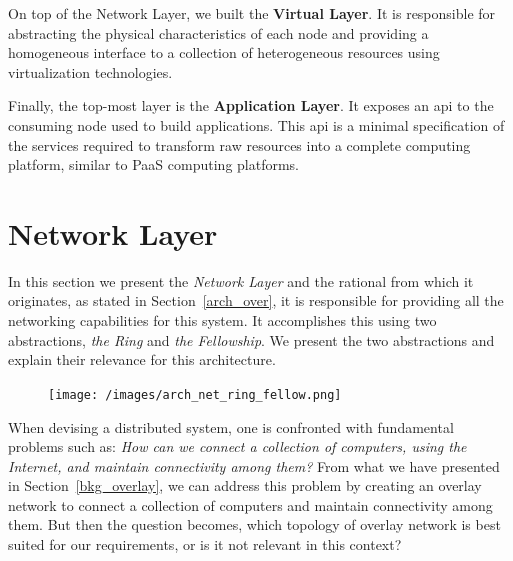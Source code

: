 \documentclass[12pt, titlepage]{uo_temp}
\begin{document}
     On top of the Network Layer, we built the \textbf{Virtual Layer}. It is
     responsible for abstracting the physical characteristics of each node and providing a
     homogeneous interface to a collection of heterogeneous resources using virtualization
     technologies. 

     Finally, the top-most layer is the \textbf{Application Layer}. It exposes an
     \gls{api} to the consuming node used to build applications. This \gls{api} is a
     minimal specification of the services required to transform raw resources into a
     complete computing platform, similar to PaaS computing platforms.

     \section{Network Layer}
     In this section we present the \emph{Network Layer} and the rational from which it
     originates, as stated in Section~\ref{arch_over}, it is responsible for providing all
     the networking capabilities for this system. It accomplishes this using two
     abstractions, \emph{the Ring} and \emph{the Fellowship}. We present the two
     abstractions and explain their relevance for this architecture.

     \begin{figure}
       \texttt{[image: /images/arch\_net\_ring\_fellow.png]}
     \end{figure}

     When devising a distributed system, one is confronted with fundamental problems such
     as: \emph{How can we connect a collection of computers, using the Internet, and
       maintain connectivity among them?} From what we have presented in
     Section~\ref{bkg_overlay}, we can address this problem by creating an overlay network
     to connect a collection of computers and maintain connectivity among them. But then
     the question becomes, which topology of overlay network is best suited for our
     requirements, or is it not relevant in this context?
\end{document}
